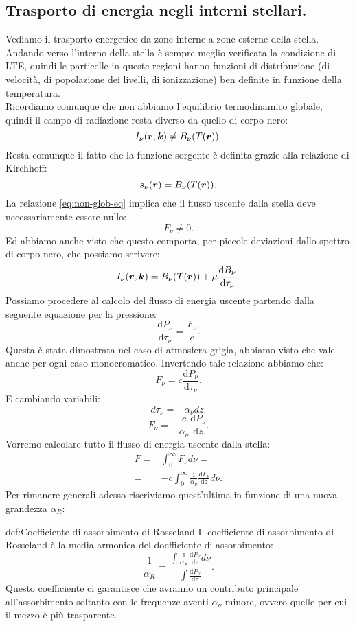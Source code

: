 \subsection{Trasporto di energia negli interni stellari.}
\label{subsec:Trasporto di energia negli interni stellari.}
Vediamo il trasporto energetico da zone interne a zone esterne della stella. Andando verso l'interno della stella è sempre meglio verificata la condizione di LTE, quindi le particelle in queste regioni hanno funzioni di distribuzione (di velocità, di popolazione dei livelli, di ionizzazione) ben definite in funzione della temperatura.\\
Ricordiamo comunque che non abbiamo l'equilibrio termodinamico globale, quindi il campo di radiazione resta diverso da quello di corpo nero:
\[
	I_{\nu}(\boldsymbol{r},\boldsymbol{k}) \neq B_\nu(T(\boldsymbol{r})) \label{eq:non-glob-eq}
.\] 
Resta comunque il fatto che la funzione sorgente è definita grazie alla relazione di Kirchhoff:
\[
	s_{\nu} (\boldsymbol{r})=B_{\nu} (T(\boldsymbol{r}))
.\] 
La relazione \ref{eq:non-glob-eq} implica che il flusso uscente dalla stella deve necessariamente essere nullo:
\[
	F_{\nu} \neq 0
.\] 
Ed abbiamo anche visto che questo comporta, per piccole deviazioni dallo spettro di corpo nero, che possiamo scrivere:
\[
	I_{\nu} (\boldsymbol{r},\boldsymbol{k})
	=
	B_{\nu} (T(\boldsymbol{r})) 
	+ \mu \frac{\mbox{d} B_{\nu} }{\mbox{d} \tau_{\nu} } 
.\] 
Possiamo procedere al calcolo del flusso di energia uscente partendo dalla seguente equazione per la pressione:
\[
	\frac{\mbox{d} P_{\nu} }{\mbox{d} \tau_{\nu} } 
	=
	\frac{F_{\nu} }{c}
.\] 
Questa è stata dimostrata nel caso di atmosfera grigia, abbiamo visto che vale anche per ogni caso monocromatico. Invertendo tale relazione abbiamo che:
\[
	F_{\nu} = c \frac{\mbox{d} P_{\nu} }{\mbox{d} \tau_{\nu} } 
.\] 
E cambiando variabili:
\[
	d\tau_{\nu} = -\alpha_{\nu} dz
.\] 
\[
	F_{\nu} 
	=
	-\frac{c}{\alpha_{\nu} }\frac{\mbox{d} P_{\nu} }{\mbox{d} z } 
.\] 
Vorremo calcolare tutto il flusso di energia uscente dalla stella:
\[\begin{aligned}
	F 
	=&
	\int_{0}^{\infty} F_{\nu} d\nu=\\
	=&
	-c \int_{0}^{\infty} 
	\frac{1}{\alpha_{\nu} } 
	\frac{\mbox{d} P_{\nu} }{\mbox{d} z } d\nu
.\end{aligned}\]
Per rimanere generali adesso riscriviamo quest'ultima in funzione di una nuova grandezza $\alpha_R$:
\begin{defn}{def:Coefficiente di assorbimento di Rosseland}
	Il coefficiente di assorbimento di Rosseland è la media armonica del doefficiente di assorbimento:
	\[
		\frac{1}{\alpha_R}
		=
		\frac{
		\int \frac{1}{\alpha_R} \frac{\mbox{d} P_{\nu} }{\mbox{d} z} d\nu
		}{
		\int \frac{\mbox{d} P_{\nu} }{\mbox{d} z} 
		}
	.\] 	
	Questo coefficiente ci garantisce che avranno un contributo principale
	all'assorbimento soltanto con le frequenze aventi $\alpha_{\nu}$ minore, 
	ovvero quelle per cui il mezzo è più trasparente.
\end{defn}
